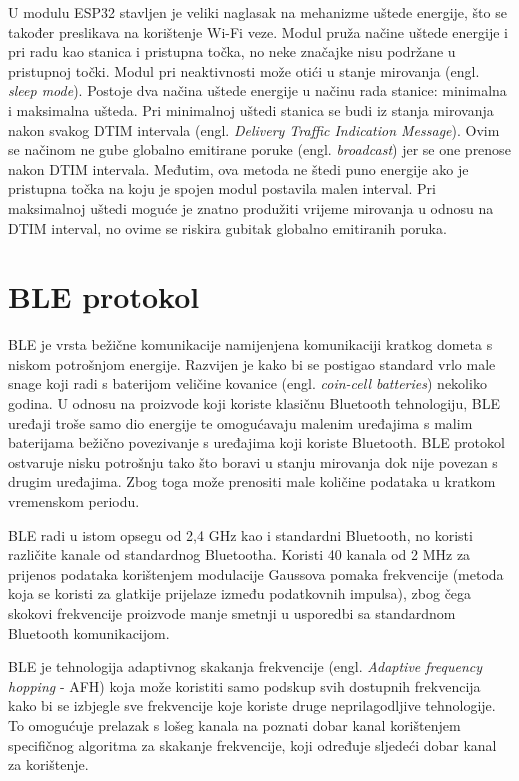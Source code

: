 U modulu ESP32 stavljen je veliki naglasak na mehanizme uštede energije, što se također preslikava na korištenje Wi-Fi veze. Modul pruža načine uštede energije i pri radu kao stanica i pristupna točka, no neke značajke nisu podržane u pristupnoj točki. Modul pri neaktivnosti može otići u stanje mirovanja (engl. \textit{sleep mode}). Postoje dva načina uštede energije u načinu rada stanice: minimalna i maksimalna ušteda. Pri minimalnoj uštedi stanica se budi iz stanja mirovanja nakon svakog DTIM intervala (engl. \textit{Delivery Traffic Indication Message}). Ovim se načinom ne gube globalno emitirane poruke (engl. \textit{broadcast}) jer se one prenose nakon DTIM intervala. Međutim, ova metoda ne štedi puno energije ako je pristupna točka na koju je spojen modul postavila malen interval. Pri maksimalnoj uštedi moguće je znatno produžiti vrijeme mirovanja u odnosu na DTIM interval, no ovime se riskira gubitak globalno emitiranih poruka. 

\section{BLE protokol}

BLE je vrsta bežične komunikacije namijenjena komunikaciji kratkog dometa s niskom potrošnjom energije. Razvijen je kako bi se postigao standard vrlo male snage koji radi s baterijom veličine kovanice (engl. \textit{coin-cell batteries}) nekoliko godina. U odnosu na proizvode koji koriste klasičnu Bluetooth tehnologiju, BLE uređaji troše samo dio energije te omogućavaju malenim uređajima s malim baterijama bežično povezivanje s uređajima koji koriste Bluetooth. BLE protokol ostvaruje nisku potrošnju tako što boravi u stanju mirovanja dok nije povezan s drugim uređajima. Zbog toga može prenositi male količine podataka u kratkom vremenskom periodu. \cite{blevsbluetooth}

BLE radi u istom opsegu od 2,4 GHz kao i standardni Bluetooth, no koristi različite kanale od standardnog Bluetootha. Koristi 40 kanala od 2 MHz za prijenos podataka korištenjem modulacije Gaussova pomaka frekvencije (metoda koja se koristi za glatkije prijelaze između podatkovnih impulsa), zbog čega skokovi frekvencije proizvode manje smetnji u usporedbi sa standardnom Bluetooth komunikacijom.

BLE je tehnologija adaptivnog skakanja frekvencije (engl. \textit{Adaptive frequency hopping} - AFH) koja može koristiti samo podskup svih dostupnih frekvencija kako bi se izbjegle sve frekvencije koje koriste druge neprilagodljive tehnologije. To omogućuje prelazak s lošeg kanala na poznati dobar kanal korištenjem specifičnog algoritma za skakanje frekvencije, koji određuje sljedeći dobar kanal za korištenje. 

